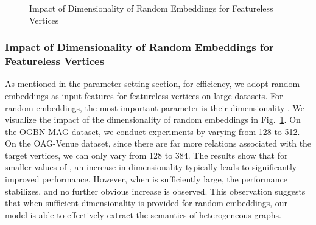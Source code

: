 \documentclass[lettersize,journal]{IEEEtran}
\begin{document}
\begin{figure}[!tp]
\vspace{-5mm}
\centering
{}
\caption{
  Impact of Dimensionality of Random Embeddings for Featureless Vertices
}
\label{fig:impact_dimension} \end{figure}












\subsubsection{Impact of Dimensionality of Random Embeddings for Featureless Vertices}


As mentioned in the parameter setting section, for efficiency, we adopt random embeddings as input features for featureless vertices on large datasets.
For random embeddings, the most important parameter is their dimensionality .
We visualize the impact of the dimensionality of random embeddings in Fig.~\ref{fig:impact_dimension}.
On the OGBN-MAG dataset, we conduct experiments by varying  from 128 to 512.
On the OAG-Venue dataset, since there are far more relations associated with the target vertices, we can only vary  from 128 to 384.
The results show that for smaller values of , an increase in dimensionality typically leads to significantly improved performance.
However, when  is sufficiently large, the performance stabilizes, and no further obvious increase is observed.
This observation suggests that when sufficient dimensionality is provided for random embeddings, our model is able to effectively extract the semantics of heterogeneous graphs.
\end{document}
